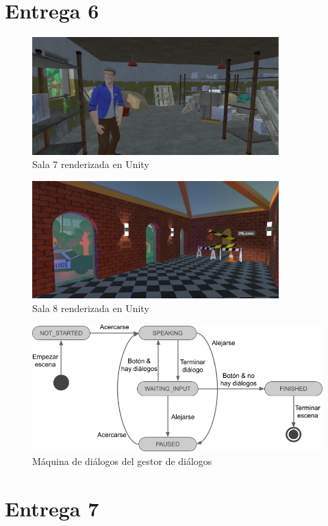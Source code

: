 \section{Entrega 6}

\begin{figure}[!h]
\begin{center}
\includegraphics[width=0.85\textwidth]{imagenes/7/salas-unity/unity-sala-7.png}
\caption{Sala 7 renderizada en Unity}
\label{fig:unity-sala-7}
\end{center}
\end{figure}

\begin{figure}[!h]
\begin{center}
\includegraphics[width=0.85\textwidth]{imagenes/7/salas-unity/unity-sala-8.png}
\caption{Sala 8 renderizada en Unity}
\label{fig:unity-sala-8}
\end{center}
\end{figure}


\begin{figure}[!h]
\begin{center}
\includegraphics[width=1\textwidth]{imagenes/7/maquina-estados-dialogos.png}
\caption{Máquina de diálogos del gestor de diálogos}
\label{fig:dialogs-state-machine}
\end{center}
\end{figure}

\section{Entrega 7}

